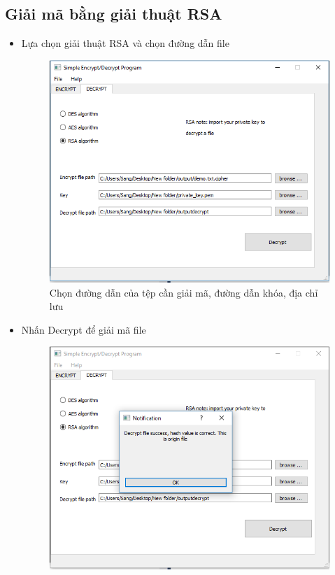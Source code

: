 \documentclass[a4paper]{article}
\begin{document}
\subsection{Giải mã bằng giải thuật RSA}
\begin{itemize}
\item
	Lựa chọn giải thuật RSA và chọn đường dẫn file
\begin{center}
    \begin{figure}[H]
    \begin{center}
     \includegraphics[scale=.5]{hinh/decrypt-rsa-1}
    \end{center}
    \caption{Chọn đường dẫn của tệp cần giải mã, đường dẫn khóa, địa chỉ lưu}
    \label{refhinh12}
    \end{figure}
\end{center}
\item
Nhấn Decrypt để giải mã file
\begin{center}
    \begin{figure}[H]
    \begin{center}
     \includegraphics[scale=.5]{hinh/decrypt-rsa-2}

\end{center}
\end{figure}
\end{center}
\end{itemize}
\end{document}
